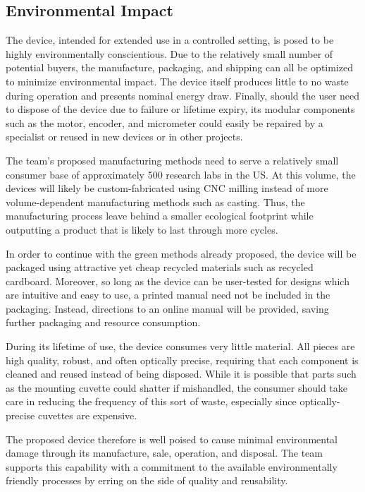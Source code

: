 \documentclass{article}
\begin{document}
\subsection{Environmental Impact}
\label{sec:environment}
 
The device, intended for extended use in a controlled setting, is posed to be highly environmentally conscientious. Due to the relatively small number of potential buyers, the manufacture, packaging, and shipping can all be optimized to minimize environmental
impact. The device itself produces little to no waste during operation and presents nominal energy draw. Finally, should the user need to dispose of the device due to failure or lifetime expiry, its modular components such as the motor, encoder, and micrometer could easily be repaired by a specialist or reused in new devices or in other projects. 
 
The team's proposed manufacturing methods need to serve a relatively small consumer base of approximately 500 research labs in the US. At this volume, the devices will likely be custom-fabricated using CNC milling instead of more volume-dependent manufacturing methods such as casting. Thus, the manufacturing process leave behind a smaller ecological footprint while outputting a product that is likely to last through more cycles.
 
In order to continue with the green methods already proposed, the device will be packaged using attractive yet cheap recycled materials such as recycled cardboard. Moreover, so long as the device can be user-tested for 
designs which are intuitive and easy to use, a printed manual need not be included in the packaging. Instead, directions to an online manual will be provided, saving
further packaging and resource consumption.
 
During its lifetime of use, the device consumes very little material. All pieces are high quality, robust, and often optically
precise, requiring that each component is cleaned and reused instead of
being disposed. While it is possible that parts such as the
mounting cuvette could shatter if mishandled, the consumer should take care in reducing the frequency of this sort of
waste, especially since optically-precise cuvettes are expensive.
 
 
The proposed device therefore is well poised to cause minimal
environmental damage through its manufacture, sale, operation, and
disposal. The team supports this capability with a commitment to the
available environmentally friendly processes by erring on the
side of quality and reusability.
 
\end{document}
